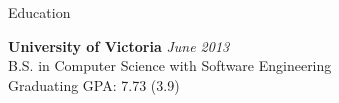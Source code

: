 \documentclass{resume} %
\begin{document}

\begin{rSection}{Education}

{\bf University of Victoria} \hfill {\em June 2013} \\ 
B.S. in Computer Science with Software Engineering \\
Graduating GPA: 7.73 (3.9)

\end{rSection}

\end{document}
